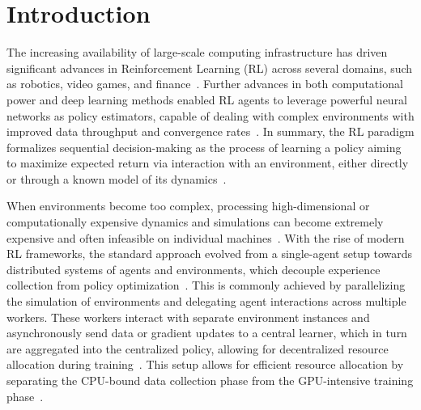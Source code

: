 
\chapter{Introduction}
\label{ch:introduction}

The increasing availability of large-scale computing infrastructure has driven significant advances
in Reinforcement Learning (RL) across several domains, such as robotics, video games, and finance~\citep{Yin2024,Hou2025,Huh2023}.
Further advances in both computational power and deep learning methods enabled RL agents to leverage powerful neural networks
as policy estimators, capable of dealing with complex environments with improved data throughput and convergence rates~\citep{Zheng2023,Jia2024}.
In summary, the RL paradigm formalizes sequential decision-making as the process of learning a policy aiming to maximize expected return
via interaction with an environment, either directly or through a known model of its dynamics~\cite{Zhu2022}.

When environments become too complex, processing high-dimensional or computationally expensive dynamics and simulations
can become extremely expensive and often infeasible on individual machines~\cite{Goudarzi2023,Fan2024}.
With the rise of modern RL frameworks, the standard approach evolved from a single-agent setup towards
distributed systems of agents and environments, which decouple experience collection from policy optimization~\cite{Furukawa2022,Kopic2024}.
This is commonly achieved by parallelizing the simulation of environments and delegating agent interactions across multiple workers.
These workers interact with separate environment instances and asynchronously send data or gradient updates to a central learner,
which in turn are aggregated into the centralized policy, allowing for decentralized resource allocation during training~\cite{Cho2023}.
This setup allows for efficient resource allocation by separating the CPU-bound data collection phase from the GPU-intensive training phase~\cite{Fayaz2022,Lu2021}.

